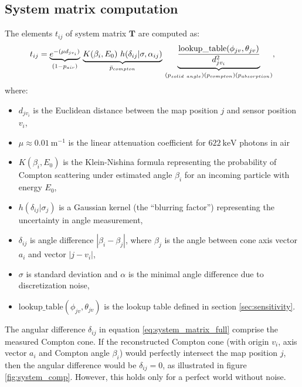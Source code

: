 \subsection{System matrix computation}
The elements $t_{ij}$ of system matrix $\mathbf{T}$ are computed as:
\begin{equation}
  t_{ij} = \underset{(1-p_{air})}{\underbrace{e^{-(\mu d_{jv_{i}})}}}\ 
  \underset{\bar{p}_{compton}} {  \underbrace{K(\beta_{i}, E_{0})\ h(\delta_{ij}|\sigma, \alpha_{ij})}} \
  \underset{(p_{solid\ angle})\\(p_{compton})\\(p_{absorption})} {\underbrace{\frac{\mathrm{lookup\_table}(\phi_{jv}, \theta_{jv})}{d_{jv_{i}}^{2}}}}
  ,%
  \label{eq:system_matrix_full}
\end{equation}
where:
\begin{itemize}
 \item $d_{jv_{i}}$ is the Euclidean distance between the map position $j$ and sensor position $v_{i}$, 
\item $\mu \approx \SI{0.01}{\meter^{-1}} $ is the linear attenuation coefficient for $\SI{622}{\kilo\electronvolt}$ photons in air\item $K(\beta_{i}, E_{0})$ is the Klein-Nishina formula representing the probability of Compton scattering under estimated angle $\beta_{i}$ for an incoming particle with energy $E_{0}$,
\item $h(\delta_{ij}|\sigma_{j})$ is a Gaussian kernel (the ``blurring factor'') representing the uncertainty in angle measurement,
\item $\delta_{ij}$ is angle difference $|\beta_{i}-\beta_{j}|$, where $\beta_{j}$ is the angle between cone axis vector $a_{i}$ and vector $|j-v_{i}|$, 
\item $\sigma$ is standard deviation and $\alpha$ is the minimal angle difference due to discretization noise,
\item $\mathrm{lookup\_table}(\phi_{jv}, \theta_{jv})$ is the lookup table defined in section \ref{sec:sensitivity}.
\end{itemize}

The angular difference $\delta_{ij}$ in equation \ref{eq:system_matrix_full} comprise the measured Compton cone.
If the reconstructed Compton cone (with origin $v_{i}$, axis vector $a_{i}$ and Compton angle $\beta_{i}$) would perfectly intersect the map position $j$, then the angular difference would be $\delta_{ij} = 0$, as illustrated in figure \ref{fig:system_comp}.
However, this holds only for a perfect world without noise.


